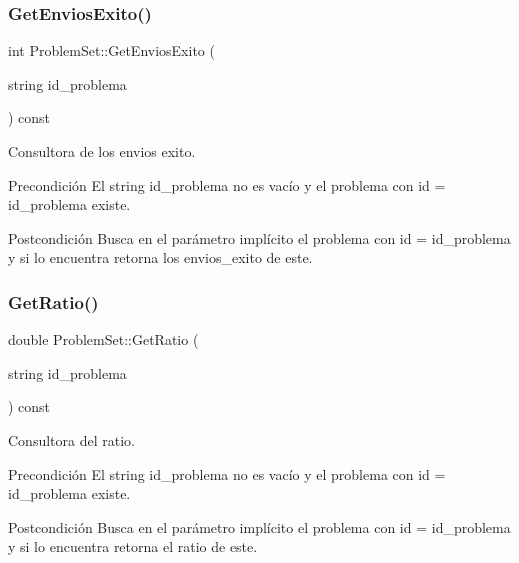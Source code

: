 \subsubsection{\texorpdfstring{Get\+Envios\+Exito()}{GetEnviosExito()}}
{\footnotesize\ttfamily int Problem\+Set\+::\+Get\+Envios\+Exito (\begin{DoxyParamCaption}\item[{string}]{id\+\_\+problema }\end{DoxyParamCaption}) const}



Consultora de los envios exito. 

\begin{DoxyPrecond}{Precondición}
El string id\+\_\+problema no es vacío y el problema con id = id\+\_\+problema existe. 
\end{DoxyPrecond}
\begin{DoxyPostcond}{Postcondición}
Busca en el parámetro implícito el problema con id = id\+\_\+problema y si lo encuentra retorna los envios\+\_\+exito de este. 
\end{DoxyPostcond}
\mbox{\label{class_problem_set_aae2358d2149c1f703d97f2882ae2bec6}} 
\subsubsection{\texorpdfstring{Get\+Ratio()}{GetRatio()}}
{\footnotesize\ttfamily double Problem\+Set\+::\+Get\+Ratio (\begin{DoxyParamCaption}\item[{string}]{id\+\_\+problema }\end{DoxyParamCaption}) const}



Consultora del ratio. 

\begin{DoxyPrecond}{Precondición}
El string id\+\_\+problema no es vacío y el problema con id = id\+\_\+problema existe. 
\end{DoxyPrecond}
\begin{DoxyPostcond}{Postcondición}
Busca en el parámetro implícito el problema con id = id\+\_\+problema y si lo encuentra retorna el ratio de este. 
\end{DoxyPostcond}
\mbox{\label{class_problem_set_ae41f8319bc9355824cf982879c7d0453}} 
